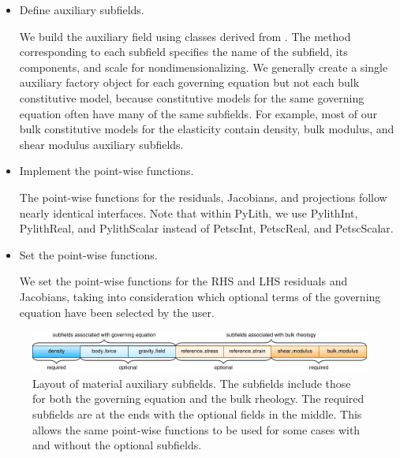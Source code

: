 \begin{itemize}
\item Define auxiliary subfields.

  We build the auxiliary field using classes derived from
  . The method
  corresponding to each subfield specifies the name of the subfield,
  its components, and scale for nondimensionalizing. We generally
  create a single auxiliary factory object for each governing equation
  but not each bulk constitutive model, because constitutive models
  for the same governing equation often have many of the same
  subfields. For example, most of our bulk constitutive models for the
  elasticity contain density, bulk modulus, and shear modulus
  auxiliary subfields.


\item Implement the point-wise functions.

  The point-wise functions for the residuals, Jacobians, and
  projections follow nearly identical interfaces. Note that within
  PyLith, we use PylithInt, PylithReal, and PylithScalar instead of
  PetscInt, PetscReal, and PetscScalar.

\item Set the point-wise functions.

  We set the point-wise functions for the RHS and LHS residuals and
  Jacobians, taking into consideration which optional terms of the
  governing equation have been selected by the user.

\end{itemize}

\begin{figure}[htbp]
  \includegraphics[scale=0.8]{developer/figs/material_auxiliarylayout}
  \caption{Layout of material auxiliary subfields. The subfields
    include those for both the governing equation and the bulk
    rheology. The required subfields are at the ends with the optional
    fields in the middle. This allows the same point-wise functions to
    be used for some cases with and without the optional subfields.}
  \label{fig:developer:material:auxiliary:subfield}
\end{figure}

